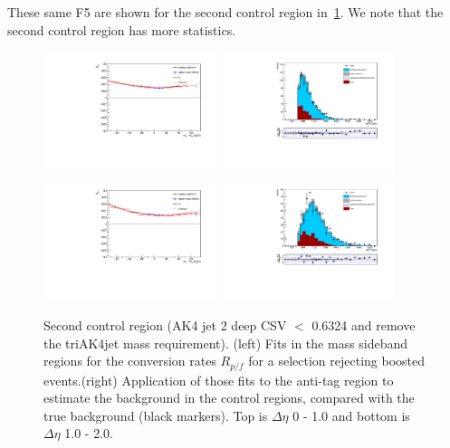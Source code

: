 These same F5 are shown for the second control region in~\ref{fig:closuredataboost2}. We note that the second control region has more statistics.

\begin{figure}[h]
\centering
\includegraphics[width=0.45\textwidth]{F5/HH4b2p1SR_Fit_BG_boost_dEta0_CR2.pdf}
\includegraphics[width=0.45\textwidth]{F5/HH4b2p1_Plot_BG_boost_dEta0_CR2.pdf}\\
\includegraphics[width=0.45\textwidth]{F5/HH4b2p1SR_Fit_BG_boost_dEta1_CR2.pdf}
\includegraphics[width=0.45\textwidth]{F5/HH4b2p1_Plot_BG_boost_dEta1_CR2.pdf}
\caption{Second control region (AK4 jet 2 deep CSV $<$ 0.6324 and remove the triAK4jet mass requirement). (left) Fits in the mass sideband regions for the conversion rates $R_{p/f}$ for a selection rejecting boosted events.(right) Application of those fits to the anti-tag region to estimate the background in the control regions, compared with the true background (black markers). Top is $\Delta\eta$ 0 - 1.0 and bottom is $\Delta\eta$ 1.0 - 2.0.}
\label{fig:closuredataboost2}
\end{figure}

